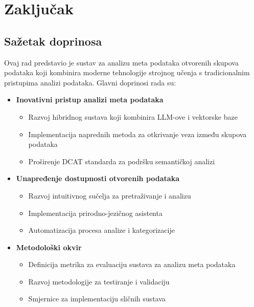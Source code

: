 \chapter{Zaključak}
\label{ch:conclusion}


\section{Sažetak doprinosa}
\label{sec:contributions}

Ovaj rad predstavio je sustav za analizu meta podataka otvorenih skupova podataka 
koji kombinira moderne tehnologije strojnog učenja s tradicionalnim pristupima 
analizi podataka. Glavni doprinosi rada su:

\begin{itemize}
    \item \textbf{Inovativni pristup analizi meta podataka}
    \begin{itemize}
        \item Razvoj hibridnog sustava koji kombinira LLM-ove i vektorske baze
        \item Implementacija naprednih metoda za otkrivanje veza između skupova podataka
        \item Proširenje DCAT standarda za podršku semantičkoj analizi
    \end{itemize}
    
    \item \textbf{Unapređenje dostupnosti otvorenih podataka}
    \begin{itemize}
        \item Razvoj intuitivnog sučelja za pretraživanje i analizu
        \item Implementacija prirodno-jezičnog asistenta
        \item Automatizacija procesa analize i kategorizacije
    \end{itemize}
    
    \item \textbf{Metodološki okvir}
    \begin{itemize}
        \item Definicija metrika za evaluaciju sustava za analizu meta podataka
        \item Razvoj metodologije za testiranje i validaciju
        \item Smjernice za implementaciju sličnih sustava
    \end{itemize}
\end{itemize}

